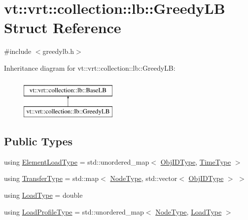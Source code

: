 \hypertarget{structvt_1_1vrt_1_1collection_1_1lb_1_1_greedy_l_b}{}\section{vt\+:\+:vrt\+:\+:collection\+:\+:lb\+:\+:Greedy\+LB Struct Reference}
\label{structvt_1_1vrt_1_1collection_1_1lb_1_1_greedy_l_b}


{\ttfamily \#include $<$greedylb.\+h$>$}

Inheritance diagram for vt\+:\+:vrt\+:\+:collection\+:\+:lb\+:\+:Greedy\+LB\+:\begin{figure}[H]
\begin{center}
\leavevmode
\includegraphics[height=2.000000cm]{structvt_1_1vrt_1_1collection_1_1lb_1_1_greedy_l_b}
\end{center}
\end{figure}
\subsection*{Public Types}
\begin{DoxyCompactItemize}
\item 
using \hyperlink{structvt_1_1vrt_1_1collection_1_1lb_1_1_greedy_l_b_af08e010a34268f2a299ce37dc428ea75}{Element\+Load\+Type} = std\+::unordered\+\_\+map$<$ \hyperlink{structvt_1_1vrt_1_1collection_1_1lb_1_1_base_l_b_a790b22acf448880599724749cdc4e9b3}{Obj\+I\+D\+Type}, \hyperlink{namespacevt_a876a9d0cd5a952859c72de8a46881442}{Time\+Type} $>$
\item 
using \hyperlink{structvt_1_1vrt_1_1collection_1_1lb_1_1_greedy_l_b_af15e80ab3cfa9337647801dfa08fbf53}{Transfer\+Type} = std\+::map$<$ \hyperlink{namespacevt_a866da9d0efc19c0a1ce79e9e492f47e2}{Node\+Type}, std\+::vector$<$ \hyperlink{structvt_1_1vrt_1_1collection_1_1lb_1_1_base_l_b_a790b22acf448880599724749cdc4e9b3}{Obj\+I\+D\+Type} $>$ $>$
\item 
using \hyperlink{structvt_1_1vrt_1_1collection_1_1lb_1_1_greedy_l_b_a7127421bb4c8c56482d07cb6e35ccc11}{Load\+Type} = double
\item 
using \hyperlink{structvt_1_1vrt_1_1collection_1_1lb_1_1_greedy_l_b_a3db2c9b36ac99ed4aed38519be4aad60}{Load\+Profile\+Type} = std\+::unordered\+\_\+map$<$ \hyperlink{namespacevt_a866da9d0efc19c0a1ce79e9e492f47e2}{Node\+Type}, \hyperlink{structvt_1_1vrt_1_1collection_1_1lb_1_1_base_l_b_a215e22b9f12678303f49615ae3be05cc}{Load\+Type} $>$
\end{DoxyCompactItemize}
